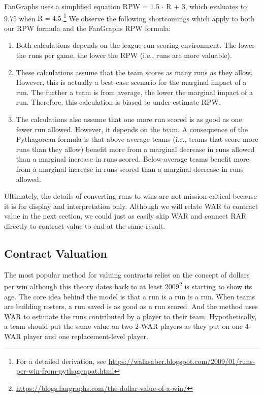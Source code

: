 \documentclass{article}
\begin{document}
        FanGraphs uses a simplified equation RPW = 1.5 $\cdot$ R + 3, which evaluates to 9.75 when $\text{R} = 4.5$.\footnote{For a detailed derivation, see \url{https://walksaber.blogspot.com/2009/01/runs-per-win-from-pythagenpat.html}} We observe the following shortcomings which apply to both our RPW formula and the FanGraphs RPW formula:
        \begin{enumerate}
          \item Both calculations depends on the league run scoring environment. The lower the runs per game, the lower the RPW (i.e., runs are more valuable).
          \item These calculations assume that the team scores as many runs as they allow. However, this is actually a best-case scenario for the marginal impact of a run. The further a team is from average, the lower the marginal impact of a run. Therefore, this calculation is biased to under-estimate RPW.
          \item The calculations also assume that one more run scored is as good as one fewer run allowed. However, it depends on the team. A consequence of the Pythagorean formula is that above-average teams (i.e., teams that score more runs than they allow) benefit more from a marginal decrease in runs allowed than a marginal increase in runs scored. Below-average teams benefit more from a marginal increase in runs scored than a marginal decrease in runs allowed.
        \end{enumerate}
        Ultimately, the details of converting runs to wins are not mission-critical because it is for display and interpretation only. Although we will relate WAR to contract value in the next section, we could just as easily skip WAR and connect RAR directly to contract value to end at the same result.

    \subsection{\sc Contract Valuation}

      The most popular method for valuing contracts relies on the concept of dollars per win although this theory dates back to at least 2009\footnote{\url{https://blogs.fangraphs.com/the-dollar-value-of-a-win/}} is starting to show its age. The core idea behind the model is that a run is a run is a run. When teams are building rosters, a run saved is as good as a run scored. And the method uses WAR to estimate the runs contributed by a player to their team. Hypothetically, a team should put the same value on two 2-WAR players as they put on one 4-WAR player and one replacement-level player.
\end{document}
